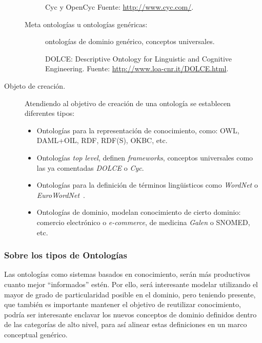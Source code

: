\begin{description}
\begin{description}
\begin{example}
Cyc y OpenCyc
Fuente: \url{http://www.cyc.com/}. 
\end{example}

\item[Meta ontologías u ontologías genéricas:] ontologías de dominio genérico,
conceptos universales.
\begin{example}
DOLCE: Descriptive Ontology for Linguistic and Cognitive Engineering.
Fuente: \url{http://www.loa-cnr.it/DOLCE.html}. 
\end{example}

\end{description}

\item [Objeto de creación.]

Atendiendo al objetivo de creación de una ontología se establecen diferentes tipos:

\begin{itemize}
  \item Ontologías para la representación de conocimiento, como: \gls{OWL},
  \gls{DAML+OIL}, \gls{RDF}, RDF(S), OKBC, etc.
  \item Ontologías \textit{top level}, definen \textit{frameworks}, conceptos
  universales como las ya comentadas \textit{DOLCE} o \textit{Cyc}. 
  \item Ontologías para la definición de términos lingüisticos como
  \textit{WordNet} o \textit{EuroWordNet}~\cite{EuroWordNet}. 

	\item Ontologías de dominio, modelan conocimiento de cierto dominio: comercio
	electrónico o \textit{e-commerce}, de medicina \textit{Galen} o SNOMED, etc. 
\end{itemize}

\end{description}


\subsubsection{Sobre los tipos de Ontologías}
Las ontologías como sistemas basados en conocimiento, serán más productivos
cuanto mejor ``informados'' estén. Por ello, será interesante modelar utilizando
el mayor de grado de particularidad posible en el dominio, pero teniendo presente, que también es
importante mantener el objetivo de reutilizar conocimiento, podría ser interesante
enclavar los nuevos conceptos de dominio definidos dentro de las categorías de
alto nivel, para así alinear estas definiciones en un marco conceptual genérico.


